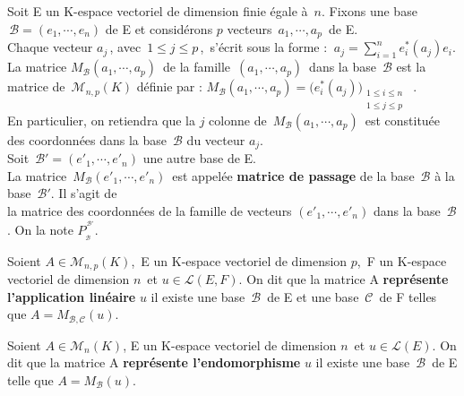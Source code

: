 \vspace{1.5cm}

Soit E un K-espace vectoriel de dimension finie égale à $\,n$. Fixons une base \(\,\mathcal{B}=(e_1,\cdots,e_n)\) de E et considérons $p$ vecteurs \(\,a_1,\cdots,a_p\,\) de E.\vspace{-0.15cm}\\
Chaque vecteur $a_j\,$, avec $\,1\leq j\leq p\,$, \,s'écrit sous la forme : \(\ \displaystyle a_j=\sum_{i=1}^{n}e_i^*(a_j)e_i\).\\
La matrice \(M_\mathcal{B}(a_1,\cdots,a_p)\,\) de la famille \(\,(a_1,\cdots,a_p)\,\) dans la base \(\,\mathcal{B}\) est la matrice de \(\,\mathcal{M}_{n,p}(K)\) définie par : \(M_\mathcal{B}(a_1,\cdots,a_p)=\bigl(e_i^*(a_j)\bigr)_{\substack{1\leq i\leq n \\ 1\leq j\leq p}}\)\ .\vspace{0.15cm}\\
En particulier, on retiendra que la $j$ colonne de \(\,M_\mathcal{B}(a_1,\cdots,a_p)\,\) est constituée des coordonnées dans la base \(\, \mathcal{B}\) du vecteur $a_j$.\vspace{0.5cm}\\
Soit \(\,\mathcal{B}'=(e'_1,\cdots,e'_n)\) une autre base de E.\vspace{0.1cm}\\
La matrice \(\,M_\mathcal{B}(e'_1,\cdots,e'_n)\,\) est appelée \textbf{matrice de passage} de la base \(\,\mathcal{B}\) à la base \(\,\mathcal{B}'\). Il s'agit de\vspace{0.1cm}\\
la matrice des coordonnées de la famille de vecteurs \((e'_1,\cdots,e'_n)\) dans la base \(\,\mathcal{B}\). On la note \(P_{_\mathcal{B}} ^{^{\,\mathcal{B}'}}\).

\vspace{1.8 cm}

Soient \(A\in \mathcal{M}_{n,p}(K)\),\, E un K-espace vectoriel de dimension $p$,\, F un K-espace vectoriel de dimension $n\,$ et \(u\in \mathscr{L}(E,F)\). On dit que la matrice A \textbf{représente l'application linéaire} $u$ \ssi il existe une base \(\,\mathcal{B}\,\) de E et une base \(\,\mathcal{C}\,\) de F telles que \(A=M_{\mathcal{B},\mathcal{C}}(u)\).

\vspace{0.5cm}

Soient \(A\in \mathcal{M}_n(K)\), E un K-espace vectoriel de dimension $n\,$ et \(u\in \mathscr{L}(E)\). On dit que la matrice A \textbf{représente l'endomorphisme} $u$ \ssi il existe une base \(\,\mathcal{B}\,\) de E telle que \(A=M_\mathcal{B}(u)\).

